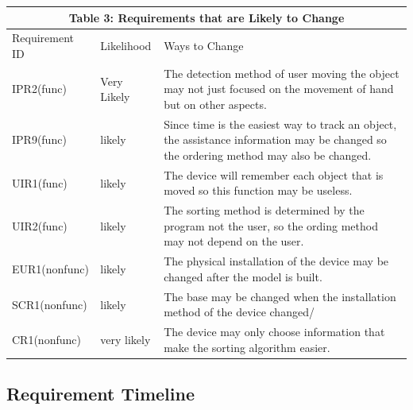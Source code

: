 \documentclass[12pt]{article}
\begin{document}
\begin{tabular}{|p{}|p{}|p{}|}

\hline \multicolumn{3}{|c|}{Table 3: Requirements that are Likely to Change}\\

\hline Requirement ID&Likelihood&Ways to Change\\

\hline IPR2(func)&Very Likely&The detection method of user moving the object may not just focused on the movement of hand but on other aspects.\\

\hline IPR9(func)&likely&Since time is the easiest way to track an object, the assistance information may be changed so the ordering method may also be changed.\\

\hline UIR1(func)&likely&The device will remember each object that is moved so this function may be useless.\\

\hline UIR2(func)&likely&The sorting method is determined by the program not the user, so the ording method may not depend on the user. \\

\hline EUR1(nonfunc)&likely&The physical installation of the device may be changed after the model is built.\\

\hline SCR1(nonfunc)&likely&The base may be changed when the installation method of the device changed/\\

\hline CR1(nonfunc)&very likely&The device may only choose information that make the sorting algorithm easier.\\

\hline

\end{tabular}

\subsection{Requirement Timeline}
\end{document}
